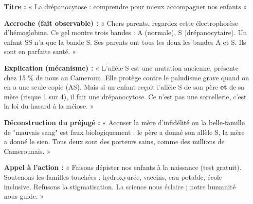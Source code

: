 \documentclass[11pt]{article}
\begin{document}
\begin{exemplebox}
\textbf{Titre :} « La drépanocytose : comprendre pour mieux accompagner nos enfants »

\textbf{Accroche (fait observable) :} « Chers parents, regardez cette électrophorèse d'hémoglobine. Ce gel montre trois bandes : A (normale), S (drépanocytaire). Un enfant SS n'a que la bande S. Ses parents ont tous les deux les bandes A et S. Ils sont en parfaite santé. »

\textbf{Explication (mécanisme) :} « L'allèle S est une mutation ancienne, présente chez 15 \% de nous au Cameroun. Elle protège contre le paludisme grave quand on en a une seule copie (AS). Mais si un enfant reçoit l'allèle S de son père \textbf{et} de sa mère (risque 1 sur 4), il fait une drépanocytose. Ce n'est pas une sorcellerie, c'est la loi du hasard à la méiose. »

\textbf{Déconstruction du préjugé :} « Accuser la mère d'infidélité ou la belle-famille de "mauvais sang" est faux biologiquement : le père a donné son allèle S, la mère a donné le sien. Tous deux sont des porteurs sains, comme des millions de Camerounais. »

\textbf{Appel à l'action :} « Faisons dépister nos enfants à la naissance (test gratuit). Soutenons les familles touchées : hydroxyurée, vaccins, eau potable, école inclusive. Refusons la stigmatisation. La science nous éclaire ; notre humanité nous guide. »
\end{exemplebox}
\end{document}
